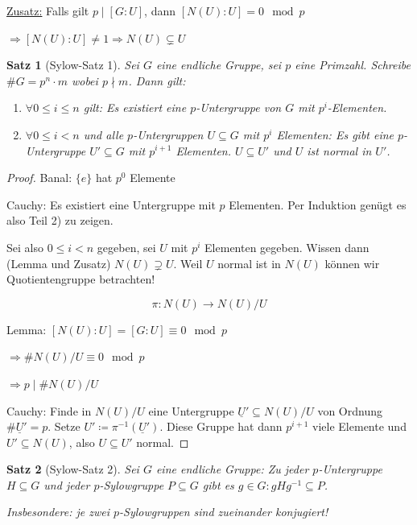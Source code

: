 \documentclass[a4paper,12pt,numbers=noenddot,parskip=full]{scrartcl}
\newcommand{\heading}{\underline}
\theoremstyle{dotless}
\newtheorem{theorem}{Satz}[section]
\theoremstyle{remark}
\begin{document}
	\heading{Zusatz:} Falls gilt $p \mid [G:U]$, dann $[N(U):U] = 0 \mod p$
	
	$\Rightarrow [N(U):U] \neq 1 \Rightarrow N(U) \subsetneq U$
	
	\begin{theorem}[Sylow-Satz 1]
		Sei $G$ eine endliche Gruppe, sei $p$ eine Primzahl. Schreibe $\#G = p^n \cdot m$ wobei $p \nmid m$. Dann gilt:
		\begin{enumerate}
			\item $\forall 0 \leq i \leq n$ gilt: Es existiert eine $p$-Untergruppe von $G$ mit $p^i$-Elementen.
			\item $\forall 0 \leq i < n$ und alle $p$-Untergruppen $U \subseteq G$ mit $p^i$ Elementen: Es gibt eine $p$-Untergruppe $U' \subseteq G$ mit $p^{i+1}$ Elementen. $U \subseteq U'$ und $U$ ist normal in $U'$.
		\end{enumerate}
	\end{theorem}

	\begin{proof}
		Banal: $\{ e \}$ hat $p^0$ Elemente
		
		Cauchy: Es existiert eine Untergruppe mit $p$ Elementen. Per Induktion genügt es also Teil 2) zu zeigen.
		
		Sei also $0 \leq i < n$ gegeben, sei $U$ mit $p^i$ Elementen gegeben. Wissen dann (Lemma und Zusatz) $N(U) \supsetneq U$. Weil $U$ normal ist in $N(U)$ können wir Quotientengruppe betrachten!
		
		\begin{equation*}
			\pi: N(U) \longrightarrow N(U) / U
		\end{equation*}
		
		Lemma: $[N(U):U] = [G: U] \equiv 0 \mod p$
		
		$\Rightarrow \# N(U)/U \equiv 0 \mod p$
		
		$\Rightarrow p \mid \# N(U)/U$
		
		Cauchy: Finde in $N(U)/U$ eine Untergruppe $\underline{U}' \subseteq N(U)/U$ von Ordnung $\#\underline{U}' = p$. Setze $U' \coloneqq \pi^{-1} (\underline{U}')$. Diese Gruppe hat dann $p^{i+1}$ viele Elemente und $U' \subseteq N(U)$, also $U \subseteq U'$ normal.
	\end{proof}

	\begin{theorem}[Sylow-Satz 2]
		Sei $G$ eine endliche Gruppe: Zu jeder $p$-Untergruppe $H \subseteq G$ und jeder $p$-Sylowgruppe $P \subseteq G$ gibt es $g \in G: g H g^{-1} \subseteq P$.
		
		Insbesondere: je zwei $p$-Sylowgruppen sind zueinander konjugiert!
	\end{theorem}
\end{document}
